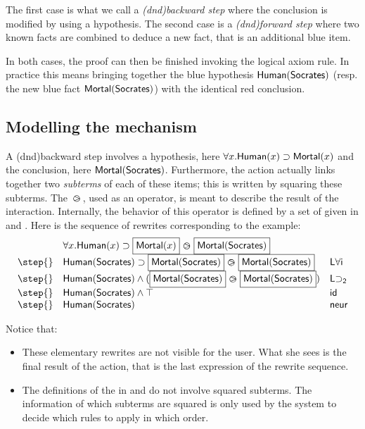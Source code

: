 The first case is what we call a {\em \intro(dnd){backward} step} where the
conclusion is modified by using a hypothesis. The second case is a {\em
\intro(dnd){forward} step} where two known facts are combined to deduce a new
fact, that is an additional blue item.

In both cases, the proof can then be finished invoking the logical axiom rule.
In practice this means bringing together the blue hypothesis $\mbox{\textsf{Human}}(\mbox{\textsf{Socrates}})$
(resp. the new blue fact $\mbox{\textsf{Mortal}}(\mbox{\textsf{Socrates}})$) with the identical red
conclusion.


\subsection{Modelling the mechanism}

A \kl(dnd){backward} step involves a hypothesis, here $\forall x.\-\mbox{\textsf{Human}}(x)
\allowbreak\supset \mbox{\textsf{Mortal}}(x)$ and the conclusion, here $\mbox{\textsf{Mortal}}(\mbox{\textsf{Socrates}})$.
Furthermore, the action actually links together two {\em subterms} of each of
these items; this is written by squaring these subterms. The  ${\operatorname{\,\varogreaterthan\,}}$,
used as an operator, is meant to describe the result of the interaction.
Internally, the behavior of this operator is defined by a set of 
given in  and . Here is the sequence of
rewrites corresponding to the example: \renewcommand{\arraystretch}{1.1}
$$\begin{array}{lll}
    &  \forall x.\human(x)\limp \select{\mortal(x)} \back \select{\mortal(\socrates)}&\\
    \step{} &
           \human(\socrates)\limp \select{\mortal(\socrates)}
           \back \select{\mortal(\socrates)}&
                                               \mathsf{L\forall i}\\
    \step{} &
           \human(\socrates)\land(\select{\mortal(\socrates)}
           \back \select{\mortal(\socrates)}) &
                                                 \mathsf{L{\limp}_2}\\
    \step{} &  \human(\socrates)\land \top &
                                           \mathsf{id}\\
    \step{} & \human(\socrates)&\mathsf{neur}\\
  \end{array}$$

Notice that:
\begin{itemize}
\item   These elementary rewrites are not visible for the user. What she sees is
  the final result of the action, that is the last expression of the rewrite
  sequence.
\item The definitions of the  in  and
   do not involve squared subterms. The information of which
  subterms are squared is only used by the system to decide which rules to
  apply in which order.
\end{itemize}

